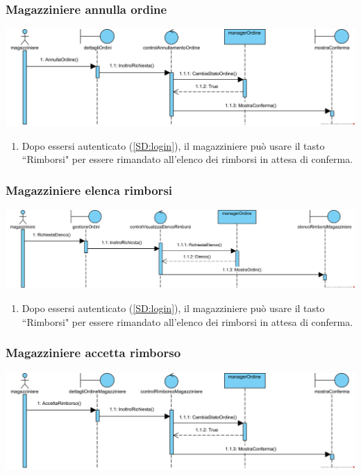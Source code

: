 \documentclass[12pt,a4paper]{article}
\begin{document}
\subsubsection{Magazziniere annulla ordine}
\label{SD:magazziniereannulla}
\begin{center}
\includegraphics[width=\textwidth]{SequenceDiagram/MagazziniereOrdineAnnulla}
\end{center}

\begin{enumerate}
\item Dopo essersi autenticato (\ref{SD:login}), il magazziniere può usare il tasto ``Rimborsi" per essere rimandato all'elenco dei rimborsi in attesa di conferma.
\end{enumerate}

\subsubsection{Magazziniere elenca rimborsi}
\label{SD:magazziniereblocca}
\begin{center}
\includegraphics[width=\textwidth]{SequenceDiagram/MagazziniereRimborsoElenco}
\end{center}

\begin{enumerate}
\item Dopo essersi autenticato (\ref{SD:login}), il magazziniere può usare il tasto ``Rimborsi" per essere rimandato all'elenco dei rimborsi in attesa di conferma.
\end{enumerate}

\subsubsection{Magazziniere accetta rimborso}
\label{SD:magazzrimborsook}
\begin{center}
\includegraphics[width=\textwidth]{SequenceDiagram/magazziniereRimborsoAccetta}
\end{center}
\end{document}
